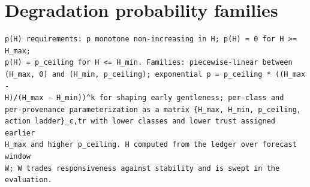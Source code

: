 \onecolumn

\section{Degradation probability families}

{\small
\begin{verbatim}
p(H) requirements: p monotone non-increasing in H; p(H) = 0 for H >= H_max;
p(H) = p_ceiling for H <= H_min. Families: piecewise-linear between
(H_max, 0) and (H_min, p_ceiling); exponential p = p_ceiling * ((H_max -
H)/(H_max - H_min))^k for shaping early gentleness; per-class and
per-provenance parameterization as a matrix {H_max, H_min, p_ceiling,
action ladder}_c,tr with lower classes and lower trust assigned earlier
H_max and higher p_ceiling. H computed from the ledger over forecast window
W; W trades responsiveness against stability and is swept in the
evaluation.
\end{verbatim}
}

\twocolumn
